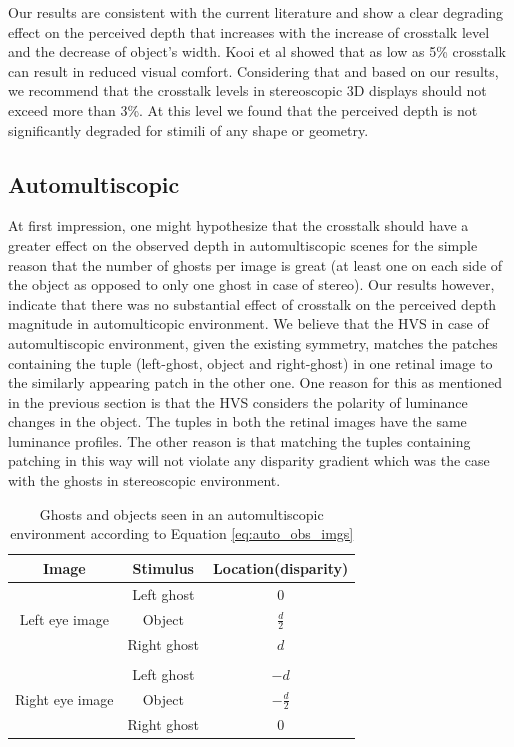 Our results are consistent with the current literature and show a clear degrading effect on the perceived depth that increases with the increase of crosstalk level and the decrease of object's width. Kooi et al \cite{kooi2004visual} showed that as low as 5\% crosstalk can result in reduced visual comfort. Considering that and based on our results, we recommend that the crosstalk levels in stereoscopic 3D displays should not exceed more than 3\%. At this level we found that the perceived depth is not significantly degraded for stimili of any shape or geometry. \pagebreak


\subsection{Automultiscopic}

At first impression, one might hypothesize that the crosstalk should have a greater effect on the observed depth in automultiscopic scenes for the simple reason that the number of ghosts per image is great (at least one on each side of the object as opposed to only one ghost in case of stereo). Our results however, indicate that there was no substantial effect of crosstalk on the perceived depth magnitude in automulticopic environment. We believe that the HVS in case of automultiscopic environment, given the existing symmetry, matches the patches containing the tuple (left-ghost, object and right-ghost) in one retinal image to the similarly appearing patch in the other one. One reason for this as mentioned in the previous section is that the HVS considers the polarity of luminance changes in the object. The tuples in both the retinal images have the same luminance profiles. The other reason is that matching the tuples containing patching in this way will not violate any disparity gradient which was the case with the ghosts in stereoscopic environment.

\begin{table}[ht!]
  \begin{center}
    \caption{Ghosts and objects seen in an automultiscopic environment according to Equation \ref{eq:auto_obs_imgs}}
    \label{tab:ghost_obj_names}
    \begin{tabular}{ccc}
      \toprule
      Image & Stimulus  & Location(disparity)\\
      \midrule
                       & Left ghost & 0  \\
      Left eye image   & Object & $\frac{d}{2}$\\
                       & Right ghost & $d$\\
                       &             & \\
                       & Left ghost & $-d$  \\
      Right eye image  & Object & $-\frac{d}{2}$\\
                       & Right ghost & 0\\
      \bottomrule
    \end{tabular}
  \end{center}
\end{table}

